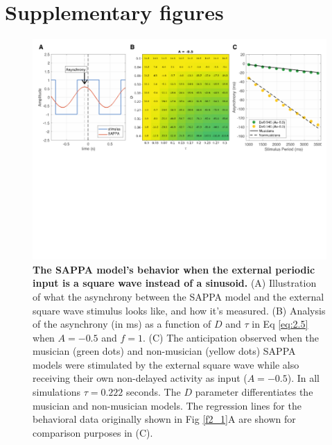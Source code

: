 \documentclass{report}
\begin{document}
\appendix
\chapter{Supplementary figures}
\begin{figure}
    \centering
    \includegraphics[width=1.0\textwidth]{figures/figS_1.png}
    \caption[The SAPPA model's behavior when the external periodic input is a square wave instead of a sinusoid]{\textbf{The SAPPA model's behavior when the external periodic input is a square wave instead of a sinusoid.} (A) Illustration of what the asynchrony between the SAPPA model and the external square wave stimulus looks like, and how it's measured. (B) Analysis of the asynchrony (in ms) as a function of $D$ and $\tau$ in Eq \eqref{eq:2.5} when $A = -0.5$ and $f = 1$. (C) The anticipation observed when the musician (green dots) and non-musician (yellow dots) SAPPA models were stimulated by the external square wave while also receiving their own non-delayed activity as input ($A = -0.5$). In all simulations $\tau = 0.222$ seconds. The $D$ parameter differentiates the musician and non-musician models. The regression lines for the behavioral data originally shown in Fig \ref{f2_1}A are shown for comparison purposes in (C).}
    \label{fS_1}
\end{figure}
\end{document}
